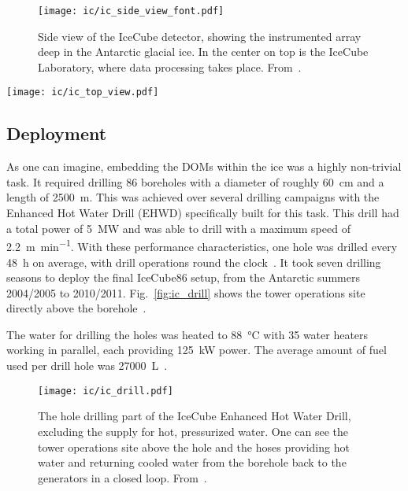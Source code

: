\begin{figure}[htbp]
    \texttt{[image: ic/ic\_side\_view\_font.pdf]}
    \caption[IceCube side-on]{Side view of the IceCube detector, showing the instrumented array deep in the Antarctic glacial ice. In the center on top is the IceCube Laboratory, where data processing takes place. From~\cite{Ahlers2018a}.}
\end{figure}

\begin{marginfigure}
    \texttt{[image: ic/ic\_top\_view.pdf]}
    \caption[IceCube top-down view]{Top-down view of the IceCube detector, spanning \SI{1}{\square\km} on the surface. From~\cite{Ahlers2018a}.}
\end{marginfigure}

\subsection{Deployment}

As one can imagine, embedding the DOMs within the ice was a highly non-trivial task. It required drilling 86 boreholes with a diameter of roughly \SI{60}{\cm} and a length of \SI{2500}{\m}. This was achieved over several drilling campaigns with the Enhanced Hot Water Drill (EHWD) specifically built for this task. This drill had a total power of \SI{5}{\mega\W} and was able to drill with a maximum speed of \SI{2.2}{\meter\per\minute}. With these performance characteristics, one hole was drilled every \SI{48}{\hour} on average, with drill operations round the clock~\cite{Aartsen2017}. It took seven drilling seasons to deploy the final IceCube86 setup, from the Antarctic summers 2004/2005 to 2010/2011. Fig.~\ref{fig:ic_drill} shows the tower operations site directly above the borehole~.

The water for drilling the holes was heated to \SI{88}{\celsius} with 35 water heaters working in parallel, each providing \SI{125}{\kilo\W} power. The average amount of fuel used per drill hole was \SI{27000}{\liter}~\cite{Benson2014}.

\begin{figure}[hbtp]
    \texttt{[image: ic/ic\_drill.pdf]}
    \caption[IceCube enhanced hot water drill]{The hole drilling part of the IceCube Enhanced Hot Water Drill, excluding the supply for hot, pressurized water. One can see the tower operations site above the hole and the hoses providing hot water and returning cooled water from the borehole back to the generators in a closed loop. From~\cite{Benson2014}.}
\end{figure}

